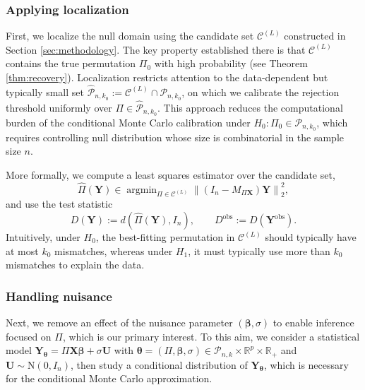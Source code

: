 \documentclass[11pt, reqno]{amsart}
\newcommand{\R}{\mathbb{R}}
\renewcommand{\hat}{\widehat}
\newcommand{\mC}{\mathcal{C}}
\newcommand{\mP}{\mathcal{P}}
\newcommand{\1}{\mbox{1}\hspace{-0.25em}\mbox{l}}
\newcommand{\obs}{\mathrm{obs}}
\DeclareMathOperator*{\argmin}{argmin}
\newcommand{\Normal}{\mathrm{N}}
\theoremstyle{definition}\newtheorem{problem}{Problem}[section]
\theoremstyle{definition}\newtheorem{definition}[problem]{Definition}
\theoremstyle{remark}\newtheorem{assumption}{Assumption}
\theoremstyle{remark}\newtheorem{remark}[problem]{Remark}
\theoremstyle{definition}\newtheorem{example}[problem]{Example}
\theoremstyle{plain}\newtheorem{theorem}[problem]{Theorem}
\theoremstyle{plain}\newtheorem{question}[problem]{Question}
\theoremstyle{plain}\newtheorem{lemma}[problem]{Lemma}
\theoremstyle{plain}\newtheorem{proposition}[problem]{Proposition}
\theoremstyle{plain}\newtheorem{corollary}[problem]{Corollary}
\theoremstyle{plain}\newtheorem{conjecture}[problem]{Conjecture}
\begin{document}
\subsubsection{Applying localization}


First, we localize the null domain using the candidate set $\mC^{(L)}$ constructed in Section \ref{sec:methodology}.
The key property established there is that $\mC^{(L)}$ contains the true permutation $\Pi_0$ with high probability (see Theorem \ref{thm:recovery}).
Localization restricts attention to the data-dependent but typically small set $\hat{\mP}_{n,k_0}:=\mC^{(L)}\cap\mP_{n,k_0}$, on which we calibrate the rejection threshold uniformly over $\Pi\in\hat{\mP}_{n,k_0}$.
This approach reduces the computational burden of the conditional Monte Carlo calibration under
$H_0:\Pi_0\in\mP_{n,k_0}$, which requires controlling null distribution whose size is combinatorial in the sample size $n$.

More formally, we compute a least squares estimator over the candidate set,
\begin{equation}\label{eq:Pi-hat-LS}
    \hat{\Pi}(\bm Y)\in\argmin_{\Pi\in\mC^{(L)}}\left\|(I_n-M_{\Pi\bm X})\bm Y\right\|_2^2,
\end{equation}
and use the test statistic
\begin{equation}\label{eq:Dk-stat}
    D(\bm Y):=d\left(\hat{\Pi}(\bm Y),I_n\right),\qquad D^{\obs}:=D(\bm Y^{\obs}).
\end{equation}
Intuitively, under $H_0$, the best-fitting permutation in $\mC^{(L)}$ should typically have at most $k_0$ mismatches, whereas under $H_1$, it must typically use more than $k_0$ mismatches to explain the data. 

\subsubsection{Handling nuisance}

Next, we remove an effect of the nuisance parameter $(\bm{\beta}, \sigma)$ to enable inference focused on $\Pi$, which is our primary interest.
To this aim, we consider a statistical model $\bm{Y}_{\bm{\theta}} = \Pi \bm{X} \bm{\beta} + \sigma \bm{U}$ with $\bm{\theta} = (\Pi, \bm{\beta}, \sigma) \in \mP_{n,k} \times \R^p \times \R_+$ and $\bm U\sim\Normal(0,I_n)$, then study a conditional distribution of $\bm{Y}_{\bm{\theta}}$, which is necessary for the conditional Monte Carlo approximation.
\end{document}
